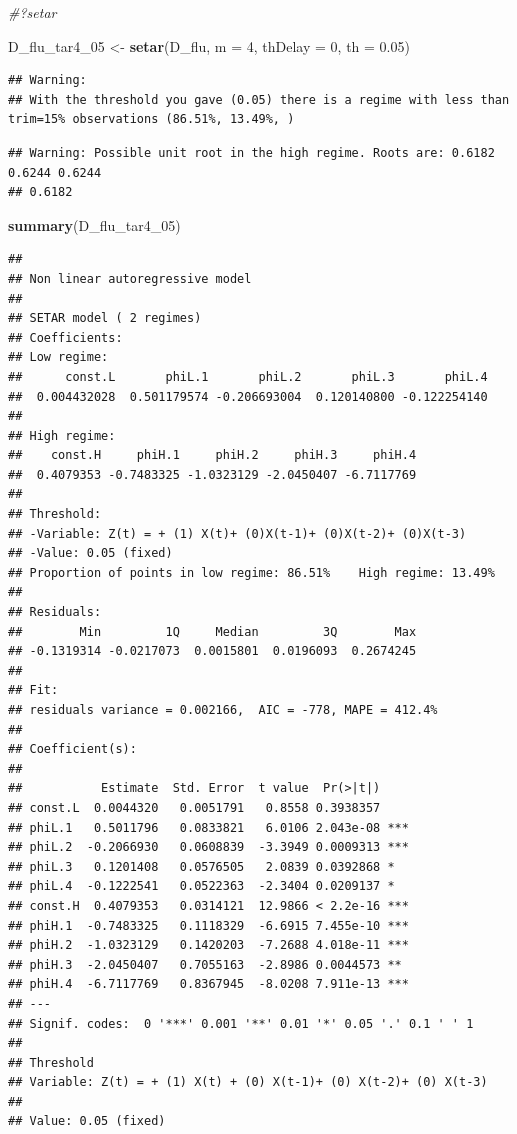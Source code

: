 \documentclass[
]{book}
\newenvironment{Shaded}{\begin{snugshade}}{\end{snugshade}}
\newcommand{\AttributeTok}[1]{\textcolor[rgb]{0.13,0.29,0.53}{#1}}
\newcommand{\CommentTok}[1]{\textcolor[rgb]{0.56,0.35,0.01}{\textit{#1}}}
\newcommand{\DecValTok}[1]{\textcolor[rgb]{0.00,0.00,0.81}{#1}}
\newcommand{\FloatTok}[1]{\textcolor[rgb]{0.00,0.00,0.81}{#1}}
\newcommand{\FunctionTok}[1]{\textcolor[rgb]{0.13,0.29,0.53}{\textbf{#1}}}
\newcommand{\NormalTok}[1]{#1}
\newcommand{\OtherTok}[1]{\textcolor[rgb]{0.56,0.35,0.01}{#1}}
\begin{document}
\begin{Shaded}
\begin{Highlighting}[]
\CommentTok{\#?setar}

\NormalTok{D\_flu\_tar4\_05 }\OtherTok{\textless{}{-}} \FunctionTok{setar}\NormalTok{(D\_flu, }\AttributeTok{m =} \DecValTok{4}\NormalTok{, }\AttributeTok{thDelay =} \DecValTok{0}\NormalTok{, }\AttributeTok{th =} \FloatTok{0.05}\NormalTok{) }
\end{Highlighting}
\end{Shaded}

\begin{verbatim}
## Warning: 
## With the threshold you gave (0.05) there is a regime with less than trim=15% observations (86.51%, 13.49%, )
\end{verbatim}

\begin{verbatim}
## Warning: Possible unit root in the high regime. Roots are: 0.6182 0.6244 0.6244
## 0.6182
\end{verbatim}

\begin{Shaded}
\begin{Highlighting}[]
\FunctionTok{summary}\NormalTok{(D\_flu\_tar4\_05) }
\end{Highlighting}
\end{Shaded}

\begin{verbatim}
## 
## Non linear autoregressive model
## 
## SETAR model ( 2 regimes)
## Coefficients:
## Low regime:
##      const.L       phiL.1       phiL.2       phiL.3       phiL.4 
##  0.004432028  0.501179574 -0.206693004  0.120140800 -0.122254140 
## 
## High regime:
##    const.H     phiH.1     phiH.2     phiH.3     phiH.4 
##  0.4079353 -0.7483325 -1.0323129 -2.0450407 -6.7117769 
## 
## Threshold:
## -Variable: Z(t) = + (1) X(t)+ (0)X(t-1)+ (0)X(t-2)+ (0)X(t-3)
## -Value: 0.05 (fixed)
## Proportion of points in low regime: 86.51%    High regime: 13.49% 
## 
## Residuals:
##        Min         1Q     Median         3Q        Max 
## -0.1319314 -0.0217073  0.0015801  0.0196093  0.2674245 
## 
## Fit:
## residuals variance = 0.002166,  AIC = -778, MAPE = 412.4%
## 
## Coefficient(s):
## 
##           Estimate  Std. Error  t value  Pr(>|t|)    
## const.L  0.0044320   0.0051791   0.8558 0.3938357    
## phiL.1   0.5011796   0.0833821   6.0106 2.043e-08 ***
## phiL.2  -0.2066930   0.0608839  -3.3949 0.0009313 ***
## phiL.3   0.1201408   0.0576505   2.0839 0.0392868 *  
## phiL.4  -0.1222541   0.0522363  -2.3404 0.0209137 *  
## const.H  0.4079353   0.0314121  12.9866 < 2.2e-16 ***
## phiH.1  -0.7483325   0.1118329  -6.6915 7.455e-10 ***
## phiH.2  -1.0323129   0.1420203  -7.2688 4.018e-11 ***
## phiH.3  -2.0450407   0.7055163  -2.8986 0.0044573 ** 
## phiH.4  -6.7117769   0.8367945  -8.0208 7.911e-13 ***
## ---
## Signif. codes:  0 '***' 0.001 '**' 0.01 '*' 0.05 '.' 0.1 ' ' 1
## 
## Threshold
## Variable: Z(t) = + (1) X(t) + (0) X(t-1)+ (0) X(t-2)+ (0) X(t-3)
## 
## Value: 0.05 (fixed)
\end{verbatim}
\end{document}
